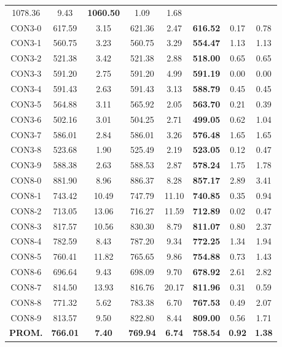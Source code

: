 \begin{table}[h]
\begin{tabular}{c c c c c c c c}
1078.36 & 9.43 & \bf{1060.50} & 
1.09 & 1.68\\CON3-0 & 617.59 & 3.15 & 
621.36 & 2.47 & \bf{616.52} & 
0.17 & 0.78\\CON3-1 & 560.75 & 3.23 & 
560.75 & 3.29 & \bf{554.47} & 
1.13 & 1.13\\CON3-2 & 521.38 & 3.42 & 
521.38 & 2.88 & \bf{518.00} & 
0.65 & 0.65\\CON3-3 & 591.20 & 2.75 & 
591.20 & 4.99 & \bf{591.19} & 
0.00 & 0.00\\CON3-4 & 591.43 & 2.63 & 
591.43 & 3.13 & \bf{588.79} & 
0.45 & 0.45\\CON3-5 & 564.88 & 3.11 & 
565.92 & 2.05 & \bf{563.70} & 
0.21 & 0.39\\CON3-6 & 502.16 & 3.01 & 
504.25 & 2.71 & \bf{499.05} & 
0.62 & 1.04\\CON3-7 & 586.01 & 2.84 & 
586.01 & 3.26 & \bf{576.48} & 
1.65 & 1.65\\CON3-8 & 523.68 & 1.90 & 
525.49 & 2.19 & \bf{523.05} & 
0.12 & 0.47\\CON3-9 & 588.38 & 2.63 & 
588.53 & 2.87 & \bf{578.24} & 
1.75 & 1.78\\CON8-0 & 881.90 & 8.96 & 
886.37 & 8.28 & \bf{857.17} & 
2.89 & 3.41\\CON8-1 & 743.42 & 10.49 & 
747.79 & 11.10 & \bf{740.85} & 
0.35 & 0.94\\CON8-2 & 713.05 & 13.06 & 
716.27 & 11.59 & \bf{712.89} & 
0.02 & 0.47\\CON8-3 & 817.57 & 10.56 & 
830.30 & 8.79 & \bf{811.07} & 
0.80 & 2.37\\CON8-4 & 782.59 & 8.43 & 
787.20 & 9.34 & \bf{772.25} & 
1.34 & 1.94\\CON8-5 & 760.41 & 11.82 & 
765.65 & 9.86 & \bf{754.88} & 
0.73 & 1.43\\CON8-6 & 696.64 & 9.43 & 
698.09 & 9.70 & \bf{678.92} & 
2.61 & 2.82\\CON8-7 & 814.50 & 13.93 & 
816.76 & 20.17 & \bf{811.96} & 
0.31 & 0.59\\CON8-8 & 771.32 & 5.62 & 
783.38 & 6.70 & \bf{767.53} & 
0.49 & 2.07\\CON8-9 & 813.57 & 9.50 & 
822.80 & 8.44 & \bf{809.00} & 
0.56 & 1.71\\\bf{PROM.} & 
\bf{766.01} & \bf{7.40} & \bf{769.94} & \bf{6.74} & \bf{758.54} & \bf{0.92} & \bf{1.38}\\[1ex]\hline
\end{tabular}
\label{table:SS-M-50-0.5}
\end{table}

